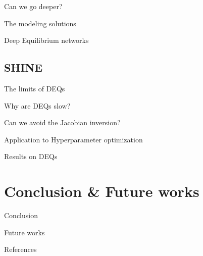 \documentclass[aspectratio=169,xcolor=dvipsnames]{beamer}
\begin{document}
\begin{frame}{Can we go deeper?}
\end{frame}

\begin{frame}{The modeling solutions}
\end{frame}

\begin{frame}{Deep Equilibrium networks}
\end{frame}

\subsection{SHINE}
\begin{frame}{The limits of DEQs}
\end{frame}

\begin{frame}{Why are DEQs slow?}
\end{frame}

\begin{frame}{Can we avoid the Jacobian inversion?}
\end{frame}

\begin{frame}{Application to Hyperparameter optimization}
\end{frame}

\begin{frame}{Results on DEQs}

\end{frame}

\section{Conclusion \& Future works}

\begin{frame}{Conclusion}
\end{frame}

\begin{frame}{Future works}
\end{frame}

\begin{frame}[allowframebreaks]{References}
    \printbibliography
\end{frame}
\end{document}
